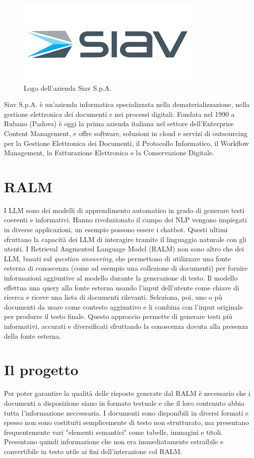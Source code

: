\begin{figure}[!h] 
    \centering 
    \includegraphics[width=0.5\columnwidth]{images/logoSiav.jpg} 
    \caption{Logo dell'azienda Siav S.p.A.}
\end{figure}
Siav S.p.A. è un’azienda informatica specializzata nella dematerializzazione, nella gestione elettronica dei documenti e nei processi digitali.
Fondata nel 1990 a Rubano (Padova) è oggi la prima azienda italiana nel settore dell’Enterprise Content Management, e offre software, soluzioni in cloud e servizi di outsourcing per la Gestione Elettronica dei Documenti, il Protocollo Informatico, il Workflow Management, la Fatturazione Elettronica e la Conservazione Digitale.

\section{RALM}
I \gls{LLM} sono dei modelli di apprendimento automatico in grado di generare testi coerenti e informativi.
Hanno rivoluzionato il campo dei \gls{NLP} vengono impiegati in diverse applicazioni, un esempio possono essere i chatbot.
Questi ultimi sfruttano la capacità dei LLM di interagire tramite il linguaggio naturale con gli utenti.
I Retrieval Augmented Language Model (RALM) non sono altro che dei LLM, basati sul \emph{\gls{question answering}}\glsfirstoccur, che permettono di utilizzare una fonte esterna di conoscenza (come ad esempio una collezione di documenti)
per fornire informazioni aggiuntive al modello durante la generazione di testo.
Il modello effettua una query alla fonte esterna usando l'input dell'utente come chiave di ricerca e riceve una lista di documenti rilevanti.
Seleziona, poi, uno o pù documenti da usare come contesto aggiuntivo e li combina con l'input originale per produrre il testo finale.
Questo approccio permette di generare testi più informativi, accurati e diversificati sfruttando la conoscenza dovuta alla presenza della fonte esterna.

\section{Il progetto}
Per poter garantire la qualità delle risposte generate dal RALM è necessario che i documenti a disposizione siano in formato testuale e che il loro contenuto abbia tutta l'informazione 
neccessaria.
I documenti sono disponibili in diversi formati e spesso non sono costituiti semplicemente di testo non strutturato, ma presentano frequentemente vari
"elementi semantici" come tabelle, immagini e titoli.
Presentano quindi informazione che non era immediatamente estraibile e convertibile in testo utile ai fini dell'interazione col RALM.

